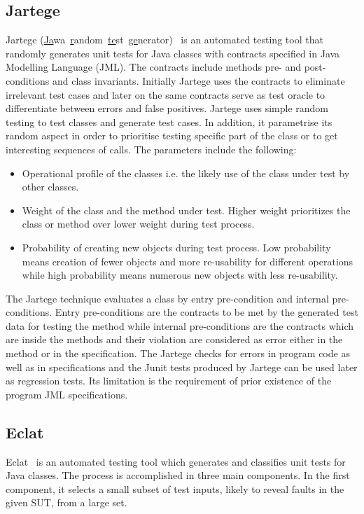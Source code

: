 \subsection{Jartege}
Jartege (\uline{Ja}wa~\uline{r}andom~\uline{te}st~\uline{ge}nerator)~\cite{Oriat2004} is an automated testing tool that randomly generates unit tests for Java classes with contracts specified in Java Modelling Language (JML). The contracts include methods pre- and post-conditions and class invariants. Initially Jartege uses the contracts to eliminate irrelevant test cases and later on the same contracts serve as test oracle to differentiate between errors and false positives. Jartege uses simple random testing to test classes and generate test cases. In addition, it parametrise its random aspect in order to prioritise testing specific part of the class or to get interesting sequences of calls. The parameters include the following: 
\begin{itemize}
\item Operational profile of the classes i.e. the likely use of the class under test by other classes.  
\item Weight of the class and the method under test. Higher weight prioritizes the class or method over lower weight during test process. 
\item Probability of creating new objects during test process. Low probability means creation of fewer objects and more re-usability for different operations while high probability means numerous new objects with less re-usability.
\end{itemize}

\noindent The Jartege technique evaluates a class by entry pre-condition and internal pre-conditions. Entry pre-conditions are the contracts to be met by the generated test data for testing the method while internal pre-conditions are the contracts which are inside the methods and their violation are considered as error either in the method or in the specification. The Jartege checks for errors in program code as well as in specifications and the Junit tests produced by Jartege can be used later as regression tests. Its limitation is the requirement of prior existence of the program JML specifications.

\subsection{Eclat}
Eclat~\cite{Pacheco2005} is an automated testing tool which generates and classifies unit tests for Java classes. The process is accomplished in three main components. In the first component, it selects a small subset of test inputs, likely to reveal faults in the given SUT, from a large set.

